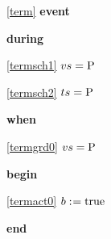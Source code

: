 \noindent \ref{term}  \textbf{event}
\begin{block}
  \item   \textbf{during}
  \begin{block}
  \item[ \eqref{termsch1} ]\sout{$vs = \text{P}$} %
  \end{block}
  \begin{block}
  \item[ \eqref{termsch2} ]{$ts = \text{P} $} %
  \end{block}
  \item   \textbf{when}
  \begin{block}
  \item[ \eqref{termgrd0} ]{$vs = \text{P}$} %
  \end{block}
  \item   \textbf{begin}
  \begin{block}
  \item[ \eqref{termact0} ]{$b \mathrel{:\mkern1mu=} \text{true} $} %
  \end{block}
  \item   \textbf{end} \\
\end{block}
